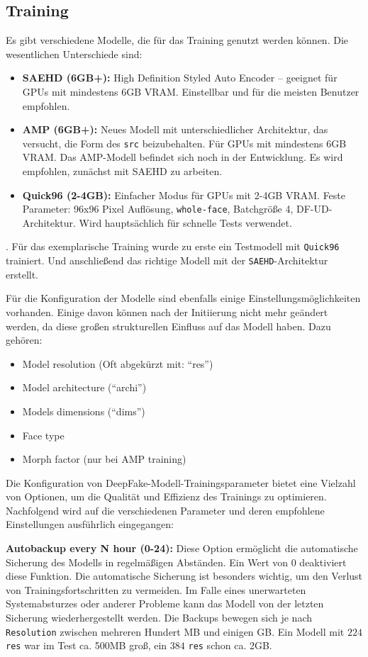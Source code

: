 \subsection*{Training}\label{subsec:training}
Es gibt verschiedene Modelle, die für das Training genutzt werden können.
Die wesentlichen Unterschiede sind:
\begin{itemize}
    \item \textbf{SAEHD (6GB+):} High Definition Styled Auto Encoder – geeignet für GPUs mit mindestens 6GB VRAM.
    Einstellbar und für die meisten Benutzer empfohlen.
    \item \textbf{AMP (6GB+):} Neues Modell mit unterschiedlicher Architektur, das versucht, die Form des \texttt{src} beizubehalten.
    Für GPUs mit mindestens 6GB VRAM.
Das AMP-Modell befindet sich noch in der Entwicklung.
    Es wird empfohlen, zunächst mit SAEHD zu arbeiten.
    \item \textbf{Quick96 (2-4GB):} Einfacher Modus für GPUs mit 2-4GB VRAM.
    Feste Parameter: 96x96 Pixel Auflösung, \texttt{whole-face}, Batchgröße 4, DF-UD-Architektur.
    Wird hauptsächlich für schnelle Tests verwendet.
\end{itemize}.
Für das exemplarische Training wurde zu erste ein Testmodell mit \texttt{Quick96} trainiert.
Und anschließend das richtige Modell mit der \texttt{SAEHD}-Architektur erstellt.

Für die Konfiguration der Modelle sind ebenfalls einige Einstellungsmöglichkeiten vorhanden.
Einige davon können nach der Initiierung nicht mehr geändert werden, da diese großen strukturellen Einfluss auf das Modell haben.
Dazu gehören:
\begin{itemize}
    \item Model resolution (Oft abgekürzt mit: ``res'')
    \item Model architecture (``archi'')
    \item Models dimensions (``dims'')
    \item Face type
    \item Morph factor (nur bei AMP training)
\end{itemize}


Die Konfiguration von DeepFake-Modell-Trainingsparameter bietet eine Vielzahl von Optionen, um die Qualität und Effizienz des Trainings zu optimieren.
Nachfolgend wird auf die verschiedenen Parameter und deren empfohlene Einstellungen ausführlich eingegangen:

\textbf{Autobackup every N hour (0-24):} Diese Option ermöglicht die automatische Sicherung des Modells in regelmäßigen Abständen.
Ein Wert von 0 deaktiviert diese Funktion.
Die automatische Sicherung ist besonders wichtig, um den Verlust von Trainingsfortschritten zu vermeiden.
Im Falle eines unerwarteten Systemabsturzes oder anderer Probleme kann das Modell von der letzten Sicherung wiederhergestellt werden.
Die Backups bewegen sich je nach \texttt{Resolution} zwischen mehreren Hundert MB und einigen GB.
Ein Modell mit $224$ \texttt{res} war im Test ca. 500MB groß, ein $384$ \texttt{res} schon ca. 2GB.\\

